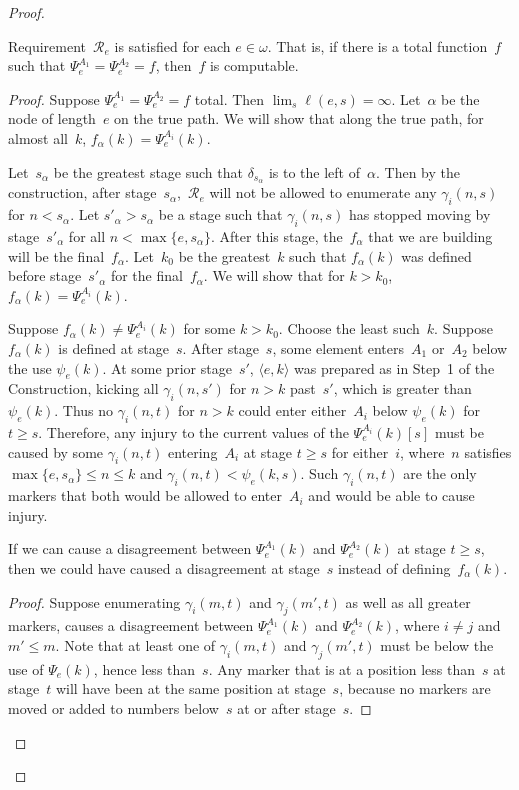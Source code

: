 \documentclass{LMCS}
\newcommand{\0}{\mathbf{0}}
\newcommand{\<}{\langle}
\renewcommand{\>}{\rangle}
\begin{document}
\begin{proof}
\begin{lem}\label{Satisfied}
Requirement~$\mathcal R_e$ is satisfied for each $e\in \omega$.  That is, if
there is a total function~$f$ such that \mbox{$\Psi_e^{A_1}=\Psi_e^{A_2}=f$,}
then~$f$ is computable.
\end{lem}

\begin{proof}
Suppose $\Psi_e^{A_1}=\Psi_e^{A_2}=f$ total.  Then $\lim_s \ell(e,s)=\infty$.
Let~$\alpha$ be the node of length~$e$ on the true path.   We will show that
along the true path, for almost all~$k$, $f_\alpha(k)=\Psi_e^{A_i}(k)$.

Let~$s_\alpha$ be the greatest stage such that $\delta_{s_\alpha}$ is to the
left of~$\alpha$.  Then by the construction, after
stage~$s_\alpha$,~$\mathcal R_e$ will not be allowed to enumerate any
$\gamma_i(n,s)$ for $n< s_\alpha$.  Let $s'_\alpha>s_\alpha$ be a stage such
that $\gamma_i(n,s)$ has stopped moving by stage~$s'_\alpha$ for all $n<
\max\{e, s_\alpha\}$.  After this stage, the~$f_\alpha$ that we are building
will be the final~$f_\alpha$. Let~$k_0$ be the greatest~$k$ such that
$f_\alpha(k)$ was defined before stage~$s'_\alpha$ for the final~$f_\alpha$.
We will show that for $k>k_0$, $f_\alpha(k)=\Psi_e^{A_i}(k)$.


Suppose $f_\alpha(k)\neq \Psi_e^{A_i}(k)$ for some $k> k_0$.  Choose the
least such~$k$.  Suppose $f_\alpha(k)$ is defined at stage~$s$.  After
stage~$s$, some element enters~$A_1$ or~$A_2$ below the use $\psi_e(k)$.  At
some prior stage~$s'$, $\langle e,k\rangle$ was prepared as in Step~1 of the
Construction, kicking all $\gamma_i(n,s')$ for $n>k$ past~$s'$, which is
greater than $\psi_e(k)$.  Thus no $\gamma_i(n,t)$ for $n>k$ could enter
either~$A_i$ below $\psi_e(k)$ for $t\geq s$.  Therefore, any injury to the
current values of the $\Psi_e^{A_i}(k)[s]$ must be caused by some
$\gamma_i(n,t)$ entering~$A_i$ at stage $t\geq s$ for either~$i$, where~$n$
satisfies $\max\{e,s_\alpha\}\leq n\leq  k$ and $\gamma_i(n,t)<\psi_e(k,s)$.
Such $\gamma_i(n,t)$ are the only markers that both would be allowed to
enter~$A_i$ and would be able to cause injury.

\begin{clm}\label{cl:dis}
If we can cause a disagreement between $\Psi_e^{A_1}(k)$ and
$\Psi_e^{A_2}(k)$ at stage $t\geq s$, then we could have caused a
disagreement at stage~$s$ instead of defining~$f_\alpha(k)$.
\end{clm}

\begin{proof}
Suppose enumerating $\gamma_i(m,t)$ and $\gamma_j(m',t)$ as well as all
greater markers, causes a disagreement between $\Psi_e^{A_1}(k)$ and
$\Psi_e^{A_2}(k)$, where $i\neq j$ and $m'\leq m$.  Note that at least one of
$\gamma_i(m,t)$ and $\gamma_j(m',t)$ must be below the use of $\Psi_e(k)$,
hence less than~$s$.  Any marker that is at a position less than~$s$
at stage~$t$ will have been at the same position at stage~$s$, because no
markers are moved or added to numbers below~$s$ at or after stage~$s$.


\end{proof}
\end{proof}
\end{proof}
\end{document}
